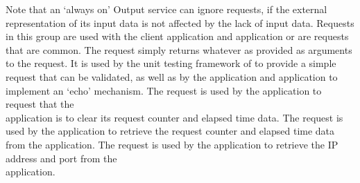 Note that an `always on' Output service can ignore
 requests, if the external
representation of its input data is not affected by the lack of input data.
\secondaryEnd
{}
Requests in this group are used with the  client
application and  application or are requests that
are common.
The  request simply returns whatever
as provided as arguments to the request.
It is used by the unit testing framework of \mplusm{} to provide a simple request that
can be validated, as well as by the  application
and  application to implement an `echo' mechanism.
The  request is used by the
 application to request that the\\
 application is to clear its request counter and
elapsed time data.
The  request is used by the
 application to retrieve the request counter and
elapsed time data from the  application.
The  request is used by the
 application to retrieve the IP address and port from the\\
 application.
\secondaryEnd
\primaryEnd{}
